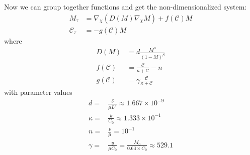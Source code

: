 \documentclass[12pt]{article}
\begin{document}
  Now we can group together functions and get the non-dimensionalized system:
  \begin{align}
    M_\tau &= \nabla_\chi \left( D(M) \nabla_\chi M \right) + f(\mathscr{C})M \\
    \mathscr{C}_\tau &= - g(\mathscr{C})M 
  \end{align}
  where
  \begin{align}
    D(M) &= d \frac{M^\alpha}{(1 - M)^\beta} \\
    f(\mathscr{C}) &= \frac{ \mathscr{C} }{\kappa  + \mathscr{C}} - n\\
    g(\mathscr{C}) &= \gamma \frac{ \mathscr{C}}{\kappa +\mathscr{C}}
  \end{align}
  with parameter values
  \begin{equation}
    \begin{aligned}
      d =& \frac{\delta}{\mu L^2} \approx 1.667 \times 10^{-9} \\
      \kappa =& \frac{k}{C_0} \approx 1.333 \times 10^{-1} \\
      n =& \frac{ \nu }{\mu} = 10^{-1} \\
      \gamma =& \frac{y}{\mu C_0} = \frac{M_0}{0.63 \times C_0}\approx 529.1
    \end{aligned}
  \end{equation}
  
\end{document}
